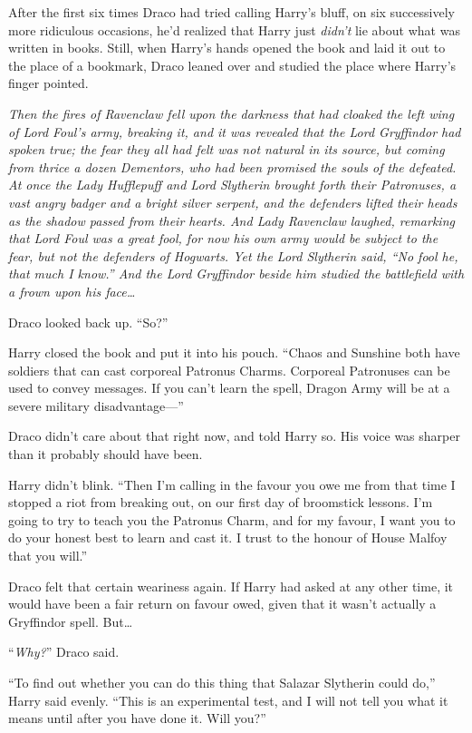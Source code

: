 After the first six times Draco had tried calling Harry’s bluff, on six successively more ridiculous occasions, he’d realized that Harry just \emph{didn’t} lie about what was written in books. Still, when Harry’s hands opened the book and laid it out to the place of a bookmark, Draco leaned over and studied the place where Harry’s finger pointed.

\emph{Then the fires of Ravenclaw fell upon the darkness that had cloaked the left wing of Lord Foul’s army, breaking it, and it was revealed that the Lord Gryffindor had spoken true; the fear they all had felt was not natural in its source, but coming from thrice a dozen Dementors, who had been promised the souls of the defeated. At once the Lady Hufflepuff and Lord Slytherin brought forth their Patronuses, a vast angry badger and a bright silver serpent, and the defenders lifted their heads as the shadow passed from their hearts. And Lady Ravenclaw laughed, remarking that Lord Foul was a great fool, for now his own army would be subject to the fear, but not the defenders of Hogwarts. Yet the Lord Slytherin said, “No fool he, that much I know.” And the Lord Gryffindor beside him studied the battlefield with a frown upon his face…}

Draco looked back up. “So?”

Harry closed the book and put it into his pouch. “Chaos and Sunshine both have soldiers that can cast corporeal Patronus Charms. Corporeal Patronuses can be used to convey messages. If you can’t learn the spell, Dragon Army will be at a severe military disadvantage—”

Draco didn’t care about that right now, and told Harry so. His voice was sharper than it probably should have been.

Harry didn’t blink. “Then I’m calling in the favour you owe me from that time I stopped a riot from breaking out, on our first day of broomstick lessons. I’m going to try to teach you the Patronus Charm, and for my favour, I want you to do your honest best to learn and cast it. I trust to the honour of House Malfoy that you will.”

Draco felt that certain weariness again. If Harry had asked at any other time, it would have been a fair return on favour owed, given that it wasn’t actually a Gryffindor spell. But…

“\emph{Why?}” Draco said.

“To find out whether you can do this thing that Salazar Slytherin could do,” Harry said evenly. “This is an experimental test, and I will not tell you what it means until after you have done it. Will you?”

